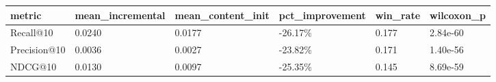 \begin{tabular}{llllll}
\toprule
metric & mean_incremental & mean_content_init & pct_improvement & win_rate & wilcoxon_p \\
\midrule
Recall@10 & 0.0240 & 0.0177 & -26.17\% & 0.177 & 2.84e-60 \\
Precision@10 & 0.0036 & 0.0027 & -23.82\% & 0.171 & 1.40e-56 \\
NDCG@10 & 0.0130 & 0.0097 & -25.35\% & 0.145 & 8.69e-59 \\
\bottomrule
\end{tabular}
